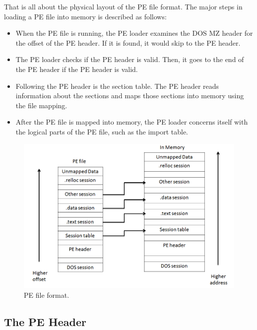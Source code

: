 That is all about the physical layout of the PE file format. The major steps in loading a PE file into memory is described as follows:

\begin{itemize}
\item When the PE file is running, the PE loader examines the DOS MZ header for the offset of the PE header. If it is found, it would skip to the PE header.
\item The PE loader checks if the PE header is valid. Then, it goes to the end of the PE header if the PE header is valid.
\item Following the PE header is the section table. The PE header reads information about the sections and maps those sections into memory using the file mapping.
\item After the PE file is mapped into memory, the PE loader concerns itself with the logical parts of the PE file, such as the import table.
\end{itemize}
\begin{figure}[h!]
\centering
\includegraphics[width=1\textwidth]{graph/pe1.png}
\caption{PE file format.}
\label{fig:pe1}
\end{figure}


\subsection{The PE Header}



